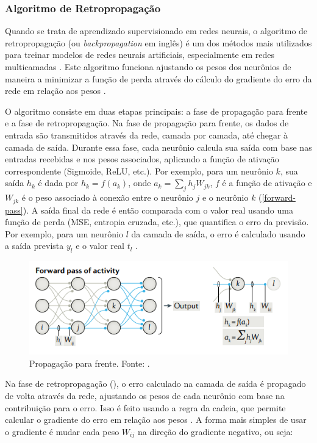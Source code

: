 \subsubsection{Algoritmo de Retropropagação}

Quando se trata de aprendizado supervisionado em redes neurais, o algoritmo de retropropagação (ou \textit{backpropagation} em inglês) é um dos métodos mais utilizados para treinar modelos de redes neurais artificiais, especialmente em redes multicamadas \citep{Sarker2021}. Este algoritmo funciona ajustando os pesos dos neurônios de maneira a minimizar a função de perda através do cálculo do gradiente do erro da rede em relação aos pesos \citep{AurlienGron2019}.

O algoritmo consiste em duas etapas principais: a fase de propagação para frente e a fase de retropropagação. Na fase de propagação para frente, os dados de entrada são transmitidos através da rede, camada por camada, até chegar à camada de saída. Durante essa fase, cada neurônio calcula sua saída com base nas entradas recebidas e nos pesos associados, aplicando a função de ativação correspondente (Sigmoide, ReLU, etc.). Por exemplo, para um neurônio $k$, sua saída $h_k$ é dada por $h_k = f(a_k)$, onde $a_k = \sum_{j} h_j W_{jk}$, $f$ é a função de ativação e $W_{jk}$ é o peso associado à conexão entre o neurônio $j$ e o neurônio $k$ (\autoref{forward-pass}). A saída final da rede é então comparada com o valor real usando uma função de perda (MSE, entropia cruzada, etc.), que quantifica o erro da previsão. Por exemplo, para um neurônio $l$ da camada de saída, o erro é calculado usando a saída prevista $y_l$ e o valor real $t_l$ \citep{Lillicrap2020}.

\begin{figure}[h]
    \centering
    \includegraphics[width=\linewidth]{figs/forward-pass.png}
    \caption{Propagação para frente. Fonte: \cite{Lillicrap2020}.}
    \label{forward-pass}
\end{figure}

Na fase de retropropagação (), o erro calculado na camada de saída é propagado de volta através da rede, ajustando os pesos de cada neurônio com base na contribuição para o erro. Isso é feito usando a regra da cadeia, que permite calcular o gradiente do erro em relação aos pesos \citep{AurlienGron2019}. A forma mais simples de usar o gradiente é mudar cada peso $W_{ij}$ na direção do gradiente negativo, ou seja:

